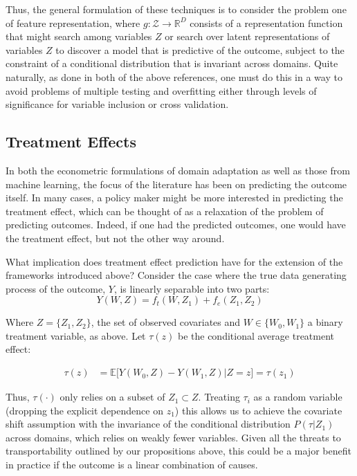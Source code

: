 \documentclass[a4paper,12pt]{article}
\begin{document}
Thus, the general formulation of these techniques is to consider the problem one of feature representation, where $g: \mathcal{Z} \rightarrow \mathbb{R}^D$ consists of a representation function that might search among variables $Z$ or search over latent representations of variables $Z$ to discover a model that is predictive of the outcome, subject to the constraint of a conditional distribution that is invariant across domains. Quite naturally, as done in both of the above references, one must do this in a way to avoid problems of multiple testing and overfitting either through levels of significance for variable inclusion or cross validation. 

\subsection{Treatment Effects}

In both the econometric formulations of domain adaptation as well as those from machine learning, the focus of the literature has been on predicting the outcome itself. In many cases, a policy maker might be more interested in predicting the treatment effect, which can be thought of as a relaxation of the problem of predicting outcomes. Indeed, if one had the predicted outcomes, one would have the treatment effect, but not the other way around. 

What implication does treatment effect prediction have for the extension of the frameworks introduced above? Consider the case where the true data generating process of the outcome, $Y$, is linearly separable into two parts: 
%
$$
Y(W,Z) = f_t(W,Z_1) + f_e(Z_1, Z_2)
$$

Where $Z = \{ Z_1, Z_2 \}$, the set of observed covariates and $W \in \{ W_0, W_1 \}$ a binary treatment variable, as above. Let $\tau(z)$ be the conditional average treatment effect: 

\begin{align*}
\tau(z) &= \mathbb{E} \big[ Y(W_0, Z) - Y(W_1, Z) | Z = z \big] = \tau(z_1)
\end{align*}

Thus, $\tau(\cdot)$ only relies on a subset of $Z_1 \subset Z$. Treating $\tau_i$ as a random variable (dropping the explicit dependence on $z_1$) this allows us to achieve the covariate shift assumption with the invariance of the conditional distribution $P(\tau | Z_1)$ across domains, which relies on weakly fewer variables. Given all the threats to transportability outlined by our propositions above, this could be a major benefit in practice if the outcome is a linear combination of causes. 
\end{document}
